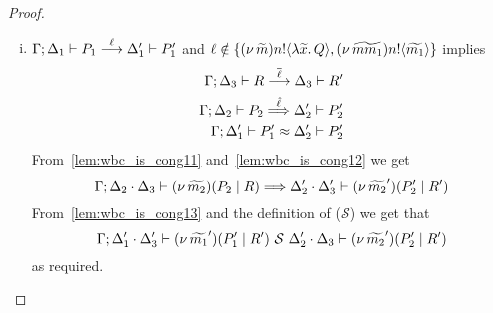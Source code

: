 \begin{proof}
\begin{enumerate}
\begin{enumerate}[i.]
				\item	$\Gamma; \Delta_1 \vdash P_1 \stackrel{\ell}{\longrightarrow} \Delta_1' \vdash P_1'$
						and $\ell \notin \{(\nu\, \widetilde{m}) n ! \langle \lambda \widetilde{x}.\,Q \rangle, (\nu\, \widetilde{mm_1}) n ! \langle \widetilde{m_1} \rangle\}$
						implies
						\begin{eqnarray}
							\Gamma; \Delta_3 \vdash R \stackrel{\overline{\ell}}{\longrightarrow} \Delta_3 \vdash R'
							\label{lem:wbc_is_cong11} \\
							\Gamma; \Delta_2 \vdash P_2 \stackrel{\hat{\ell}}{\Longrightarrow} \Delta_2' \vdash P_2'
							\label{lem:wbc_is_cong12}\\
							\Gamma; \Delta_1' \vdash P_1' \approx \Delta_2' \vdash P_2'
							\label{lem:wbc_is_cong13}
						\end{eqnarray}
						\noi From~\eqref{lem:wbc_is_cong11} and~\eqref{lem:wbc_is_cong12} we get
						\[
							\Gamma; \Delta_2 \cdot \Delta_3 \vdash (\nu\, \widetilde{m_2})(P_2 \;|\; R) \stackrel{}{\Longrightarrow} \Delta_2' \cdot \Delta_3' \vdash (\nu\, \widetilde{m_2}')(P_2' \;|\; R')
						\]
						\noi From~\eqref{lem:wbc_is_cong13} and the definition of ($\mathcal{S}$) we get that
						\[
							\Gamma; \Delta_1' \cdot \Delta_3' \vdash (\nu\, \widetilde{m_1}')(P_1' \;|\; R') \ \mathcal{S}\  \Delta_2' \cdot \Delta_3 \vdash (\nu\, \widetilde{m_2}')(P_2' \;|\; R')
						\]
						\noi as required.


\end{enumerate}
\end{enumerate}
\end{proof}
